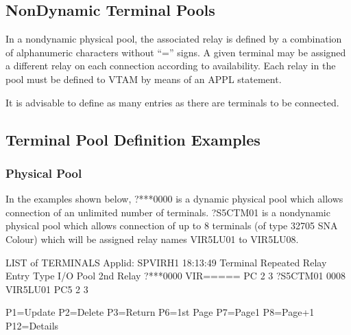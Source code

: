 \documentclass[letterpaper,10pt,english]{sphinxmanual}
\begin{document}
\subsection{Non\sphinxhyphen{}Dynamic Terminal Pools}
\label{\detokenize{connectivity_guide:non-dynamic-terminal-pools}}\label{\detokenize{connectivity_guide:index-141}}
\sphinxAtStartPar
In a non\sphinxhyphen{}dynamic physical pool, the associated relay is defined by a combination of alphanumeric characters without “=” signs. A given terminal may be assigned a different relay on each connection according to availability. Each relay in the pool must be defined to VTAM by means of an APPL statement.

\sphinxAtStartPar
It is advisable to define as many entries as there are terminals to be connected.

\ignorespaces 

\subsection{Terminal Pool Definition Examples}
\label{\detokenize{connectivity_guide:terminal-pool-definition-examples}}\label{\detokenize{connectivity_guide:index-142}}

\subsubsection{Physical Pool}
\label{\detokenize{connectivity_guide:physical-pool}}
\sphinxAtStartPar
In the examples shown below, ?***0000 is a dynamic physical pool which allows connection of an unlimited number of terminals. ?S5CTM01 is a non\sphinxhyphen{}dynamic physical pool which allows connection of up to 8 terminals (of type 3270\sphinxhyphen{}5 SNA Colour) which will be assigned relay names VIR5LU01 to VIR5LU08.

\begin{sphinxVerbatim}[commandchars=\\\{\}]
LIST of TERMINALS \PYGZhy{}\PYGZhy{}\PYGZhy{}\PYGZhy{}\PYGZhy{}\PYGZhy{}\PYGZhy{}\PYGZhy{}\PYGZhy{}\PYGZhy{}\PYGZhy{}\PYGZhy{}\PYGZhy{}\PYGZhy{}\PYGZhy{}\PYGZhy{}\PYGZhy{}\PYGZhy{}\PYGZhy{}\PYGZhy{}\PYGZhy{}\PYGZhy{}\PYGZhy{}\PYGZhy{}\PYGZhy{}\PYGZhy{}\PYGZhy{}\PYGZhy{}\PYGZhy{}\PYGZhy{}\PYGZhy{}\PYGZhy{}\PYGZhy{}\PYGZhy{} Applid: SPVIRH1 18:13:49
Terminal Repeated   Relay    Entry   Type I/O Pool 2nd Relay
?***0000            VIR===== PC      2    3
?S5CTM01 0008       VIR5LU01 PC5     2    3


P1=Update           P2=Delete        P3=Return         P6=1st Page
P7=Page\PYGZhy{}1           P8=Page+1        P12=Details
\end{sphinxVerbatim}
\end{document}
